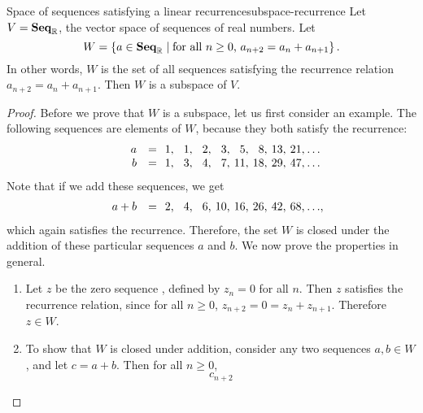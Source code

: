 \begin{example}{Space of sequences satisfying a linear recurrence}{subspace-recurrence}
  Let $V=\mathbf{Seq}_{\mathbb{R}}$, the vector space of sequences of real
  numbers. Let
  \begin{equation*}
    W = \left\{a \in \mathbf{Seq}_{\mathbb{R}} \mid \mbox{for all $n\geq 0$, $a_{n+2}=a_n+a_{n+1}$}\right\}.
  \end{equation*}
  In other words, $W$ is the set of all sequences satisfying the
  recurrence relation $a_{n+2}=a_n+a_{n+1}$. Then $W$ is a subspace of\/ $V$.
\end{example}

\begin{proof}
  \def\x#1{\makebox[1.2em][r]{$#1$}}
  \def\y#1{\makebox[3em][r]{$#1$}}
  \def\z#1{\makebox[0em][l]{$#1$}}
  Before we prove that $W$ is a subspace, let us first consider an
  example. The following sequences are elements of\/ $W$, because they
  both satisfy the recurrence:
  \begin{equation*}
    \begin{array}{rc@{}l}
      \y{a} &=& \x{1},\x{1},\x{2},\x{3},\x{5},\x{8},\x{13},\x{21},\x{\ldots} \\
      \y{b} &=& \x{1},\x{3},\x{4},\x{7},\x{11},\x{18},\x{29},\x{47},\x{\ldots}
    \end{array}
  \end{equation*}
  Note that if we add these sequences, we get
  \begin{equation*}
    \begin{array}{rc@{}l}
      \y{a+b} &=& \x{2},\x{4},\x{6},\x{10},\x{16},\x{26},\x{42},\x{68},\x{\ldots}\z{,} \\
    \end{array}
  \end{equation*}
  which again satisfies the recurrence. Therefore, the set $W$ is
  closed under the addition of these particular sequences $a$ and
  $b$. We now prove the properties in general.
  \begin{enumerate}
  \item Let $z$ be the zero sequence%
    , defined by $z_n=0$ for all $n$.
    Then $z$ satisfies the recurrence relation, since for all $n\geq 0$,
    $z_{n+2}=0=z_n+z_{n+1}$. Therefore $z\in W$.
  \item To show that $W$ is closed under addition, consider any two
    sequences $a,b\in W$, and let $c=a+b$. Then for all $n\geq 0$,
    \begin{equation*}
      c_{n+2}

\end{equation*}
\end{enumerate}
\end{proof}
